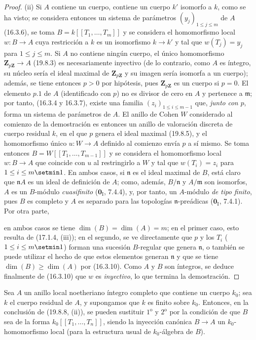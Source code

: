 \begin{proof}
\medskip
\noindent(ii)\enspace
Si $A$ contiene un cuerpo, contiene un cuerpo $k'$ isomorfo a $k$, como se ha
visto; se considera entonces un sistema de parámetros
$(y_j)_{1\leq j\leq m}$ de $A$ (16.3.6), se toma
$B=k[[T_1,\ldots,T_m]]$ y se considera el homomorfismo local $w:B\to A$ cuya
restricción a $k$ es un isomorfismo $k\to k'$ y tal que
$w(T_j)=y_j$ para $1\leq j\leq m$. Si $A$ no contiene ningún cuerpo, el único
homomorfismo $\mathbf Z_{p\mathbf Z}\to A$ (19.8.3) es necesariamente
inyectivo (de lo contrario, como $A$ es íntegro, su núcleo sería el ideal
maximal de $\mathbf Z_{p\mathbf Z}$ y su imagen sería isomorfa a un cuerpo);
además, se tiene entonces $p>0$ por hipótesis, pues
$\mathbf Z_{p\mathbf Z}$ es un cuerpo si $p=0$. El elemento $p.1$ de $A$
(identificado con $p$) no es divisor de cero en $A$ y pertenece a
$\mathfrak m$; por tanto, (16.3.4 y 16.3.7), existe una familia
$(z_i)_{1\leq i\leq m-1}$ que, \emph{junto con $p$}, forma un sistema de parámetros
de $A$. El anillo de Cohen $W$ considerado al comienzo de la demostración es
entonces un anillo de valoración discreta de cuerpo residual $k$, en el que
$p$ genera el ideal maximal (19.8.5), y el homomorfismo único $u:W\to A$
definido al comienzo envía $p$ a sí mismo. Se toma entonces
$B=W[[T_1,\ldots,T_{m-1}]]$ y se considera el homomorfismo local $w:B\to A$
que coincide con $u$ al restringirlo a $W$ y tal que $w(T_i)=z_i$ para
$1\leq i\leq m\setmin 1$. En ambos casos, si $\mathfrak n$ es el ideal maximal de
$B$, está claro que $\mathfrak nA$ es un ideal de definición de $A$; como,
además, $B/\mathfrak n$ y $A/\mathfrak m$ son isomorfos, $A$ es un
$B$-módulo \emph{cuasifinito} ($\mathbf 0_{\mathrm I}$, 7.4.4), y, por tanto, un
$A$-módulo \emph{de tipo finito}, pues $B$ es completo y $A$ es
separado para las topologías $\mathfrak n$-preádicas
($\mathbf 0_{\mathrm I}$, 7.4.1). Por otra
parte,


en ambos casos se tiene $\dim(B)=\dim(A)=m$; en el primer caso, esto resulta
de (17.1.4, (iii)); en el segundo, se ve directamente que $p$ y los $T_i$
($1\leq i\leq m\setmin 1$) forman una sucesión $B$-regular que genera $\mathfrak n$,
o también se puede utilizar el hecho de que estos elementos generan
$\mathfrak n$ y que se tiene $\dim(B)\geq\dim(A)$ por (16.3.10). Como $A$ y
$B$ son íntegros, se deduce finalmente de (16.3.10) que $w$ es \emph{inyectivo}, lo
que termina la demostración.
\end{proof}

\begin{corollary}[19.8.9]
\label{0.19.8.9-fr}
Sea $A$ un anillo local noetheriano íntegro completo que contiene un cuerpo
$k_0$; sea $k$ el cuerpo residual de $A$, y supongamos que $k$ es finito sobre
$k_0$. Entonces, en la conclusión de \textup{(19.8.8, (ii))}, se pueden sustituir
$1^{\mathrm o}$ y $2^{\mathrm o}$ por la condición de que $B$ sea de la forma
$k_0[[T_1,\ldots,T_n]]$, siendo la inyección canónica $B\to A$ un
$k_0$-homomorfismo local (para la estructura usual de $k_0$-álgebra de $B$).
\end{corollary}

